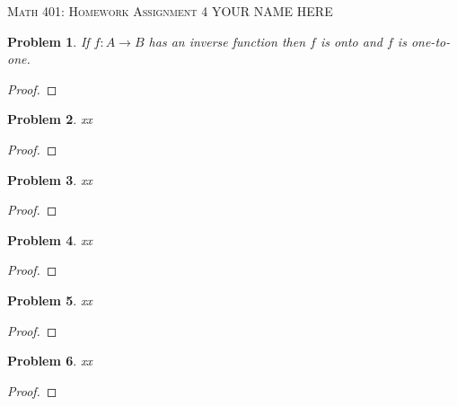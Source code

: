 \documentclass[12pt]{article}
\newtheorem{problem}{Problem}
\begin{document}
\small
\noindent \textsc{Math 401: Homework Assignment 4} \hfill YOUR NAME HERE

\normalsize
\bigskip

\setcounter{problem}{21}


\begin{problem} %
If $f:A\to B$ has an inverse function then $f$ is onto and $f$ is one-to-one.
\end{problem}


\begin{proof}
\end{proof}


\begin{problem} %
xx
\end{problem}


\begin{proof}
\end{proof}


\begin{problem} %
xx
\end{problem}


\begin{proof}
\end{proof}


\begin{problem} %
xx
\end{problem}


\begin{proof}
\end{proof}


\begin{problem} %
xx
\end{problem}


\begin{proof}
\end{proof}


\begin{problem} %
xx
\end{problem}


\begin{proof}
\end{proof}
\end{document}
